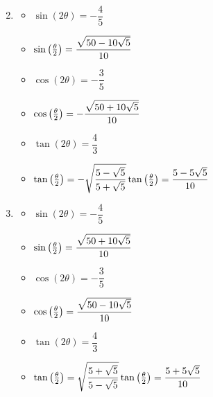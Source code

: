 \begin{enumerate}
\begin{multicols}{3}
\begin{itemize}
\end{itemize}

\end{multicols}

\item \begin{multicols}{3}

\begin{itemize}

\item $\sin(2\theta) = -\dfrac{4}{5}$
\item $\sin\left(\frac{\theta}{2}\right) = \dfrac{\sqrt{50-10\sqrt{5}}}{10} \\ \phantom{\tan\left(\frac{\theta}{2}\right) =\dfrac{5-5\sqrt{5}}{10}}$ 

\item $\cos(2\theta) = -\dfrac{3}{5}$
\item $\cos\left(\frac{\theta}{2}\right)= -\dfrac{\sqrt{50+10\sqrt{5}}}{10} \\ \phantom{\tan\left(\frac{\theta}{2}\right) =\dfrac{5-5\sqrt{5}}{10}}$ 
\item $\tan(2\theta)=\dfrac{4}{3}$
\item $\tan\left(\frac{\theta}{2}\right) =  -\sqrt{\dfrac{5-\sqrt{5}}{5+\sqrt{5}}} \\ \tan\left(\frac{\theta}{2}\right) =\dfrac{5-5\sqrt{5}}{10}$

\end{itemize}

\end{multicols}

\item \begin{multicols}{3}

\begin{itemize}

\item $\sin(2\theta) = -\dfrac{4}{5}$
\item $\sin\left(\frac{\theta}{2}\right) = \dfrac{\sqrt{50+10\sqrt{5}}}{10} \\ \phantom{\tan\left(\frac{\theta}{2}\right) =\dfrac{5-5\sqrt{5}}{10}}$ 

\item $\cos(2\theta) = -\dfrac{3}{5}$
\item $\cos\left(\frac{\theta}{2}\right)= \dfrac{\sqrt{50-10\sqrt{5}}}{10} \\ \phantom{\tan\left(\frac{\theta}{2}\right) =\dfrac{5-5\sqrt{5}}{10}}$ 
\item $\tan(2\theta)=\dfrac{4}{3}$
\item $\tan\left(\frac{\theta}{2}\right) =  \sqrt{\dfrac{5+\sqrt{5}}{5-\sqrt{5}}} \\ \tan\left(\frac{\theta}{2}\right) =\dfrac{5+5\sqrt{5}}{10}$

\end{itemize}

\end{multicols}

\setcounter{HW}{\value{enumi}}

\end{enumerate}

